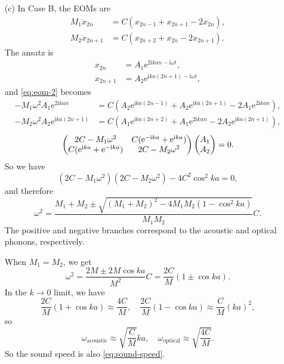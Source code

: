 \documentclass[hyperref, a4paper]{article}
\newcommand*{\ii}{\mathrm{i}}
\newcommand*{\ee}{\mathrm{e}}
\begin{document}
\begin{itemize}
\item[(c)] In Case B, the EOMs are 
\begin{equation}
    \begin{aligned}
        M_1 \ddot{x}_{2n}   &= C (x_{2n-1} + x_{2n+1} - 2x_{2n}), \\
        M_2 \ddot{x}_{2n+1} &= C (x_{2n+2} + x_{2n}   - 2x_{2n+1}).
    \end{aligned}
    \label{eq:eom-2}
\end{equation}
The ansatz is 
\begin{equation}
    \begin{aligned}
        x_{2n}   &= A_1 \ee^{2 \ii k a n      - \ii \omega t}, \\
        x_{2n+1} &= A_2 \ee^{\ii k a (2n + 1) - \ii \omega t},
    \end{aligned}
\end{equation}
and \eqref{eq:eom-2} becomes 
\[
    \begin{aligned}
        - M_1 \omega^2 A_1 \ee^{2 \ii k a n} 
        &= C (A_2 \ee^{\ii k a (2n - 1)} + A_2 \ee^{\ii k a (2n + 1)} - 2 A_1 \ee^{2 \ii k a n}), \\
        - M_2 \omega^2 A_2 \ee^{\ii k a (2n + 1)} 
        &= C (A_1 \ee^{\ii k a (2n + 2)} + A_1 \ee^{2 \ii k a n} - 2 A_2 \ee^{\ii k a (2n + 1)}),
    \end{aligned}
\] 
\begin{equation}
    \pmqty{
        2C - M_1 \omega^2                    &  C (\ee^{- \ii k a} + \ee^{\ii k a}) \\
        C (\ee^{\ii k a} + \ee^{- \ii k a})  &  2C - M_2 \omega^2 
    } \pmqty{A_1 \\ A_2} = 0.
\end{equation}
So we have 
\begin{equation}
    (2C - M_1 \omega^2) (2C - M_2 \omega^2)
    - 4 C^2 \cos^2 ka = 0,
\end{equation}
and therefore 
\begin{equation}
    \omega^2 = \frac{M_1 + M_2 \pm \sqrt{(M_1 + M_2)^2 - 4 M_1 M_2 (1 - \cos^2 ka)}}{M_1 M_2} C.
\end{equation}
The positive and negative branches correspond to the acoustic and optical phonons, respectively.

When $M_1 = M_2$, we get 
\begin{equation}
    \omega^2 = \frac{2M \pm 2M \cos ka}{M^2} C = \frac{2C}{M} (1 \pm \cos ka).
\end{equation}
In the $k \to 0$ limit, we have 
\[
    \frac{2C}{M} (1 + \cos ka) \approx \frac{4C}{M}, \quad 
    \frac{2C}{M} (1 - \cos ka) \approx \frac{C}{M} (ka)^2, 
\]
so 
\begin{equation}
    \omega_{\text{acoustic}} \approx \sqrt{\frac{C}{M}} k a, \quad 
    \omega_{\text{optical}}  \approx \sqrt{\frac{4 C}{M}}.
\end{equation}
So the sound speed is also \eqref{eq:sound-speed}.


\end{itemize}
\end{document}
